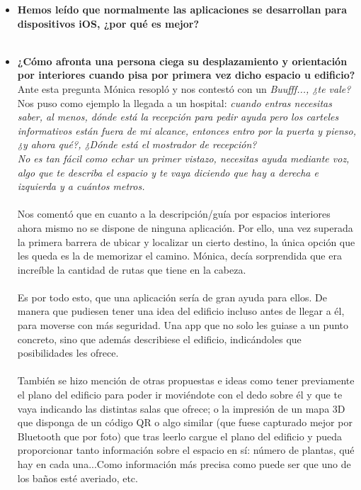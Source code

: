 \documentclass{article}
\begin{document}
\begin{itemize}
		\item \textbf{Hemos leído que normalmente las aplicaciones se desarrollan para dispositivos iOS, ¿por qué es mejor?}
		\\
		\\
		\item \textbf{¿Cómo afronta una persona ciega su desplazamiento y orientación por interiores cuando pisa por primera vez dicho espacio u edificio?}
		\\
		Ante esta pregunta Mónica resopló y nos contestó con un \textit{Buufff..., ¿te vale?}
		\\
		Nos puso como ejemplo la llegada a un hospital: \textit{cuando entras necesitas saber, al menos, dónde está la recepción para pedir ayuda pero los carteles informativos están fuera de mi alcance, entonces entro por la puerta y pienso, ¿y ahora qué?, ¿Dónde está el mostrador de recepción? 
		\\
		No es tan fácil como echar un primer vistazo, necesitas ayuda mediante voz, algo que te describa el espacio y te vaya diciendo que hay a derecha e izquierda y a cuántos metros.}
		\\
		\\
		Nos comentó que en cuanto a la descripción/guía por espacios interiores ahora mismo no se dispone de ninguna aplicación. Por ello, una vez superada la primera barrera de ubicar y localizar un cierto destino, la única opción que les queda es la de memorizar el camino. Mónica, decía sorprendida que era increíble la cantidad de rutas que tiene en la cabeza.
		\\
		\\
		Es por todo esto, que una aplicación sería de gran ayuda para ellos. De manera que pudiesen tener una idea del edificio incluso antes de llegar a él, para moverse con más seguridad. Una app que no solo les guiase a un punto concreto, sino que además describiese el edificio, indicándoles que posibilidades les ofrece.
		\\
		\\
		También se hizo mención de otras propuestas e ideas como tener previamente el plano del edificio para poder ir moviéndote con el dedo sobre él y que te vaya indicando las distintas salas que ofrece; o la impresión de un mapa 3D que disponga de un código QR o algo similar (que fuese capturado mejor por Bluetooth que por foto) que tras leerlo cargue el plano del edificio y pueda proporcionar tanto información sobre el espacio en sí: número de plantas, qué hay en cada una...Como información más precisa como puede ser que uno de los baños esté averiado, etc.

\end{itemize}
\end{document}
